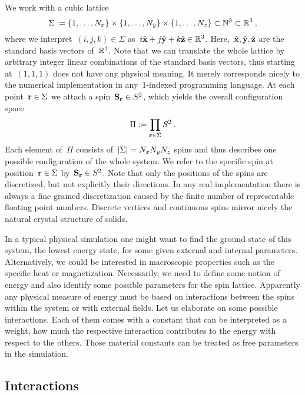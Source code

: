 We work with a cubic lattice
%
\begin{equation}
  \Sigma := \{1,\dots,N_x\} \times \{1,\dots,N_y\} \times
  \{1,\dots,N_z\} \subset \mathbb{N}^3 \subset \mathbb{R}^3\:,
\end{equation}
%
where we interpret~$(i,j,k) \in \Sigma$ as~$i \hat{\mathbf{x}} + j \hat{\mathbf{y}} + k \hat{\mathbf{z}}
\in \mathbb{R}^3$. Here,~$\hat{\mathbf{x}}, \hat{\mathbf{y}}, \hat{\mathbf{z}}$ are the standard basis vectors of~$\mathbb{R}^3$.
Note that we can translate the whole lattice by arbitrary integer linear
combinations of the standard basis vectors, thus starting at~$(1,1,1)$ does not
have any physical meaning. It merely corresponds nicely to the numerical
implementation in any~$1$-indexed programming language. At each point~$\mathbf{r} \in
\Sigma$ we attach a spin~$\mathbf{S}_{\mathbf{r}} \in S^2$, which yields the overall
configuration space
%
\begin{equation}
  \Pi := \prod_{\mathbf{r} \in \Sigma} S^2\:.
\end{equation}
%
Each element of~$\Pi$ consists of~$\abs{\Sigma}=N_x N_y N_z$ spins and thus
describes one possible configuration of the whole system. We refer to the
specific spin at position~$\mathbf{r} \in \Sigma$ by~$\mathbf{S}_{\mathbf{r}} \in S^2$. Note that only
the positions of the spins are discretized, but not explicitly their directions.
In any real implementation there is always a fine grained discretization caused
by the finite number of representable floating point numbers. Discrete vertices
and continuous spins mirror nicely the natural crystal structure of solids.

In a typical physical simulation one might want to find the ground state of this
system, \ie{} the lowest energy state, for some given external and internal
parameters. Alternatively, we could be interested in macroscopic properties such
as the specific heat or magnetization. Necessarily, we need to define some
notion of energy and also identify some possible parameters for the spin
lattice. Apparently any physical measure of energy must be based on interactions
between the spins within the system or with external fields. Let us elaborate on
some possible interactions.  Each of them comes with a constant that can be
interpreted as a weight, \ie{} how much the respective interaction contributes
to the energy with respect to the others. Those material constants can be
treated as free parameters in the simulation.

\subsection{Interactions}

